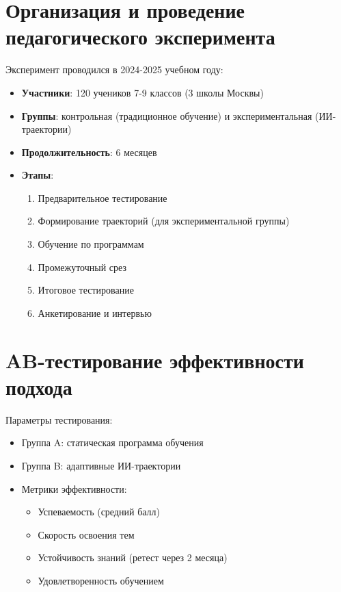 \documentclass[a4paper,14pt]{extreport}
\begin{document}
\section{Организация и проведение педагогического эксперимента}
Эксперимент проводился в 2024-2025 учебном году:
\begin{itemize}
    \item \textbf{Участники}: 120 учеников 7-9 классов (3 школы Москвы)
    \item \textbf{Группы}: контрольная (традиционное обучение) и экспериментальная (ИИ-траектории)
    \item \textbf{Продолжительность}: 6 месяцев
    \item \textbf{Этапы}:
        \begin{enumerate}
            \item Предварительное тестирование
            \item Формирование траекторий (для экспериментальной группы)
            \item Обучение по программам
            \item Промежуточный срез
            \item Итоговое тестирование
            \item Анкетирование и интервью
        \end{enumerate}
\end{itemize}

\section{AB-тестирование эффективности подхода}
Параметры тестирования:
\begin{itemize}
    \item Группа A: статическая программа обучения
    \item Группа B: адаптивные ИИ-траектории
    \item Метрики эффективности:
        \begin{itemize}
            \item Успеваемость (средний балл)
            \item Скорость освоения тем
            \item Устойчивость знаний (ретест через 2 месяца)
            \item Удовлетворенность обучением
        \end{itemize}
\end{itemize}
\end{document}

